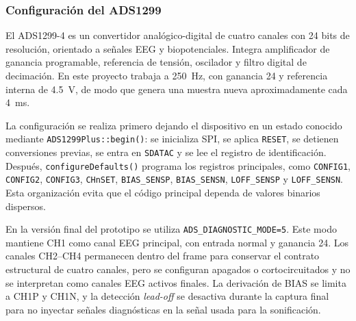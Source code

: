 \subsubsection{Configuración del ADS1299}

El ADS1299-4 es un convertidor analógico-digital de cuatro canales con 24 bits de resolución, orientado a señales EEG y biopotenciales. Integra amplificador de ganancia programable, referencia de tensión, oscilador y filtro digital de decimación. En este proyecto trabaja a \SI{250}{\hertz}, con ganancia 24 y referencia interna de \SI{4.5}{\volt}, de modo que genera una muestra nueva aproximadamente cada \SI{4}{\milli\second}.

La configuración se realiza primero dejando el dispositivo en un estado conocido mediante \texttt{ADS1299Plus::begin()}: se inicializa SPI, se aplica \texttt{RESET}, se detienen conversiones previas, se entra en \texttt{SDATAC} y se lee el registro de identificación. Después, \texttt{configureDefaults()} programa los registros principales, como \texttt{CONFIG1}, \texttt{CONFIG2}, \texttt{CONFIG3}, \texttt{CHnSET}, \texttt{BIAS\_SENSP}, \texttt{BIAS\_SENSN}, \texttt{LOFF\_SENSP} y \texttt{LOFF\_SENSN}. Esta organización evita que el código principal dependa de valores binarios dispersos.

En la versión final del prototipo se utiliza \texttt{ADS\_DIAGNOSTIC\_MODE=5}. Este modo mantiene CH1 como canal EEG principal, con entrada normal y ganancia 24. Los canales CH2--CH4 permanecen dentro del frame para conservar el contrato estructural de cuatro canales, pero se configuran apagados o cortocircuitados y no se interpretan como canales EEG activos finales. La derivación de BIAS se limita a CH1P y CH1N, y la detección \textit{lead-off} se desactiva durante la captura final para no inyectar señales diagnósticas en la señal usada para la sonificación.

